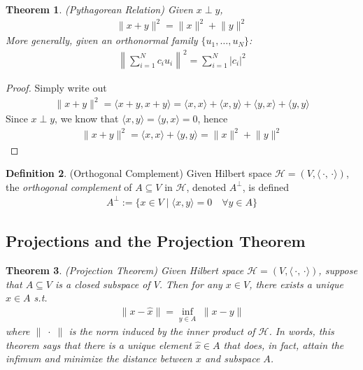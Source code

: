 \documentclass[12pt]{article}
\numberwithin{equation}{section} %
\theoremstyle{plain}
\newtheorem{thm}{Theorem}[section]
\theoremstyle{definition}
\newtheorem{defn}[thm]{Definition}
\theoremstyle{remark}
\newcommand{\calH}{\mathcal{H}}
\begin{document}
\begin{thm}
\label{pythag}
\emph{(Pythagorean Relation)} Given $x\perp y$,
\begin{align*}
    \lVert x + y\rVert^2 = \lVert x\rVert^2 + \lVert y \rVert^2
\end{align*}
More generally, given an orthonormal family $\{u_1,\ldots,u_N\}$:
\begin{align*}
  \left\lVert \sum_{i=1}^N c_i u_i \right\rVert^2
  = \sum_{i=1}^N |c_i|^2
\end{align*}
\end{thm}
\begin{proof}
Simply write out
\begin{align*}
  \lVert x + y\rVert^2 =
  \langle x + y, x + y\rangle
  =
  \langle x , x \rangle
  +
  \langle x , y \rangle
  +
  \langle y , x \rangle
  +
  \langle y , y \rangle
\end{align*}
Since $x\perp y$, we know that $\langle x,y \rangle = \langle y,x
\rangle =0$, hence
\begin{align*}
  \lVert x + y\rVert^2 =
  \langle x , x \rangle
  +
  \langle y , y \rangle
  =
  \lVert x\rVert^2 + \lVert y\rVert^2
\end{align*}
\end{proof}

\begin{defn}(Orthogonal Complement)
Given Hilbert space $\calH=(V,\langle\,\cdot,\,\cdot\rangle)$, the
\emph{orthogonal complement} of $A\subseteq V$ in $\calH$, denoted
$A^\perp$, is defined
\begin{align*}
  A^\perp :=
  \{
    x \in V \;|\; \langle x,y\rangle = 0
    \quad \forall y\in A
  \}
\end{align*}
\end{defn}

\clearpage
\subsection{Projections and the Projection Theorem}

\begin{thm}\emph{(Projection Theorem)}
Given Hilbert space $\calH=(V,\langle\,\cdot,\,\cdot\rangle)$,
suppose that $A\subseteq V$ is a \emph{closed} subspace of $V$.
Then for any $x\in V$, there exists a \emph{unique}
$\hat{x}\in A$ s.t.
\begin{align}
  \lVert x-\hat{x} \rVert =
  \inf_{y\in A} \; \lVert x-y\rVert
  \label{projthm}
\end{align}
where $\lVert\;\cdot\;\rVert$ is the norm induced by the inner product
of $\calH$. In words, this theorem says that there is a unique element
$\hat{x}\in A$ that does, in fact, attain the infimum and minimize the
distance between $x$ and subspace $A$.
\end{thm}
\end{document}
